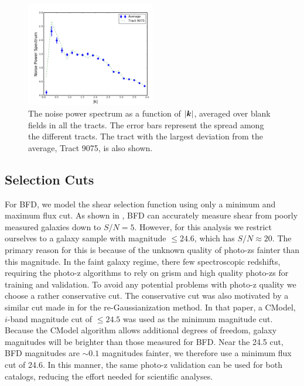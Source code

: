 \documentclass[useAMS,usenatbib]{mnras}
\newcommand{\veck}{\mbox{\boldmath $k$}}
\begin{document}
\begin{figure}
    \includegraphics[width=0.5\textwidth]{noise_ps.png}
    \caption{
       The noise power spectrum as a function of $|\veck|$, averaged over blank fields in all the tracts.  The error bars represent the spread among the different tracts.  The tract with the largest deviation from the average, Tract 9075, is also shown.
    }
    \label{fig:noise_ps}
\end{figure}

\subsection{Selection Cuts}

For BFD, we model the shear selection function using only a minimum and maximum flux cut.  As shown in \cite{Bernstein2016}, BFD can accurately measure shear from poorly measured galaxies down to $S/N=5$. However, for this analysis we restrict ourselves to a galaxy sample with magnitude $\le 24.6$, which has $S/N\approx20$.  The primary reason for this is because of the unknown quality of photo-zs fainter than this magnitude.  In the faint galaxy regime, there few spectroscopic redshifts, requiring the photo-z algorithms to rely on grism and high quality photo-zs for training and validation.  To avoid any potential problems with photo-z quality we choose a rather conservative cut.  The conservative cut was also motivated by a similar cut made in \cite{ShearPaper:inprep} for the re-Gaussianization method.  In that paper, a CModel, $i$-band magnitude cut of $\le 24.5$ was used as the minimum magnitude cut.  Because the CModel algorithm allows additional degrees of freedom, galaxy magnitudes will be brighter than those measured for BFD.  Near the 24.5 cut, BFD magnitudes are $\sim0.1$ magnitudes fainter, we therefore use a minimum flux cut of 24.6.  In this manner, the same photo-z validation can be used for both catalogs, reducing the effort needed for scientific analyses.
\end{document}
